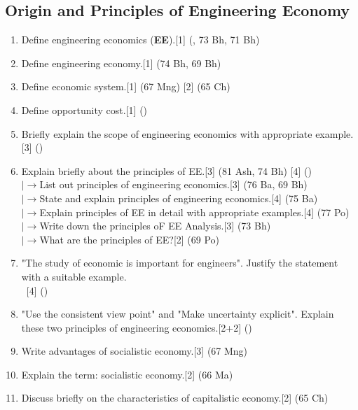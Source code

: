 \documentclass[12pt]{article}
\newcommand{\lb}{\\ $\left|\rightarrow\right.$}
\newcommand{\enter}{\\\textcolor{white}{1}}
\begin{document}
	\subsection{Origin and Principles of Engineering Economy}
	\begin{enumerate}[noitemsep, topsep=0pt]
	\item Define engineering economics (\textbf{EE}).\hfill[1] (, 73 Bh, 71 Bh)
	\item Define engineering economy.\hfill[1] (74 Bh, 69 Bh)
	\item Define economic system.\hfill [1] (67 Mng) [2] (65 Ch)
	\item Define opportunity cost.\hfill[1] ()
	\item  Briefly explain the scope of
	engineering economics with appropriate example.\hfill [3] ()
	\item Explain briefly about the principles of EE.\hfill[3] (81 Ash, 74 Bh) [4] ()
	\lb List out principles of engineering economics.\hfill[3] (76 Ba, 69 Bh)
	\lb State and explain principles of engineering economics.\hfill[4] (75 Ba)
	\lb Explain principles of EE in detail with appropriate examples.\hfill[4] (77 Po)
	\lb Write down the principles oF EE Analysis.\hfill[3] (73 Bh)
	\lb What are the principles of EE?\hfill[2] (69 Po)
	\item "The study of economic is important for engineers". Justify the statement with a suitable example.
	\enter\hfill[4] ()
	\item "Use the consistent view point" and "Make uncertainty explicit". Explain these two
	principles of engineering economics.\hfill[2+2] ()
	\item Write advantages of socialistic economy.\hfill[3] (67 Mng)
	\item Explain the term: socialistic economy.\hfill[2] (66 Ma)
	\item Discuss briefly on the characteristics of capitalistic economy.\hfill[2] (65 Ch)
	\end{enumerate}
    
\end{document}
